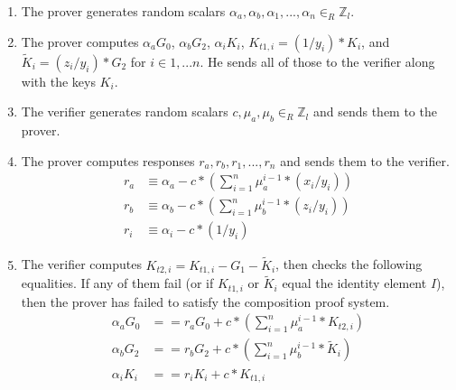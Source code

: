 \begin{appendices}
\begin{enumerate}
    \item The prover generates random scalars $\alpha_a, \alpha_b, \alpha_1, ..., \alpha_n \in_R \mathbb{Z}_l$.

    \item The prover computes $\alpha_a G_0$, $\alpha_b G_2$, $\alpha_i K_i$, $K_{t1,i} = (1/y_i)*K_i$, and $\tilde{K}_i = (z_i/y_i)*G_2$ for $i \in 1,...n$. He sends all of those to the verifier along with the keys $K_i$.

    \item The verifier generates random scalars $c, \mu_a, \mu_b \in_R \mathbb{Z}_l$ and sends them to the prover.

    \item The prover computes responses $r_a, r_b, r_1, ..., r_n$ and sends them to the verifier.\vspace{.115cm}
    \begin{align*}
        r_a &\equiv \alpha_a - c*(\sum^n_{i=1} \mu_a^{i-1}*(x_i/y_i)) \\
        r_b &\equiv \alpha_b - c*(\sum^n_{i=1} \mu_b^{i-1}*(z_i/y_i)) \\
        r_i &\equiv \alpha_i - c*(1/y_i)
    \end{align*}

    \item The verifier computes $K_{t2,i} = K_{t1,i} - G_1 - \tilde{K}_i$, then checks the following equalities. If any of them fail (or if $K_{t1,i}$ or $\tilde{K}_i$ equal the identity element $I$), then the prover has failed to satisfy the composition proof system.\vspace{.115cm}
    \begin{align*}
        \alpha_a G_0 &== r_a G_0 + c*(\sum^n_{i=1} \mu_a^{i-1}*K_{t2,i}) \\
        \alpha_b G_2 &== r_b G_2 + c*(\sum^n_{i=1} \mu_b^{i-1}*\tilde{K}_i) \\
        \alpha_i K_i &== r_i K_i + c*K_{t1,i}
    \end{align*}
\end{enumerate}

\end{appendices}
